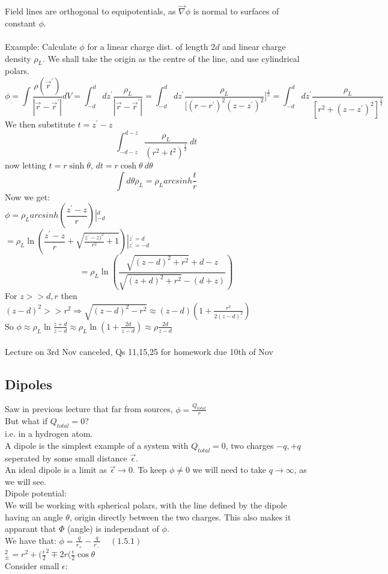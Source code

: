 \documentclass[a4paper,11pt]{article}
\begin{document}
Field lines are orthogonal to equipotentials, as $\vec{\nabla}\phi$ is normal to surfaces of constant $\phi$.\\
\\
Example: Calculate $\phi$ for a linear charge dist. of length $2d$ and linear charge density $\rho _{L}$.
We shall take the origin as the centre of the line, and use cylindrical polars.\\
$$\phi = \int \dfrac{\rho(\vec{r}^\prime)}{|\vec{r}-\vec{r}^\prime|} dV = \int^d _{-d} dz^\prime \dfrac{\rho_{L}}{|\vec{r}-\vec{r}^\prime|}=\int ^d _{-d} dz^\prime \dfrac{\rho_{L}}{[(r-r^\prime)^2(z-z^\prime)^2}]^\frac{1}{2} =\int^d _{-d} dz^\prime \dfrac{\rho _{L}}{[r^2 +(z-z^\prime)^2]^\frac{1}{2}}$$
We then substitute $t=z^\prime - z$\\
$$\int^{d-z} _{-d-z} \dfrac{\rho_{L}}{(r^2 + t^2)^\frac{1}{2}} ~dt$$
now letting $t=r\sinh\theta$, $dt=r\cosh\theta ~d\theta$\\
$$\int d\theta \rho_{L} = \rho_{L} arcsinh\frac{t}{r}$$
Now we get:\\
$\phi=\rho_{L} arcsinh\left(\dfrac{z^\prime -z}{r}\right) \left|^d _{-d} \right.$\\
$=\rho_{L} \ln\left(\dfrac{z^\prime - z}{r}+\sqrt{\frac{z^\prime-z)^2}{r^2}+1} \right )\left|^{z^\prime =d} _{z^\prime = -d} \right.$\\
$$=\rho_L \ln(\dfrac{\sqrt{(z-d)^2 +r^2}+d-z}{\sqrt{(z+d)^2 +r^2}-(d+z)})$$
For $z>>d,r$ then $(z-d)^2 >>r^2 \Rightarrow \sqrt{(z-d)^2 -r^2} \approx (z-d)(1+\frac{r^2}{2(z-d)^2})$\\
So $\phi \approx \rho_{L} \ln \frac{z+d}{z-d} \approx \rho_L \ln(1+\frac{2d}{z-d}) \approx \rho \frac{2d}{z-d}$\\ 
\\
Lecture on 3rd Nov canceled, Qs 11,15,25 for homework due 10th of Nov

\subsection{Dipoles}

Saw in previous lecture that far from sources, $\phi=\frac{Q_{total}}{r}$\\
But what if $Q_{total} = 0$?\\
i.e. in a hydrogen atom.\\
A dipole is the simplest example of a system with $Q_{total}=0$, two charges $-q,+q$ seperated by some small distance $\vec{\epsilon}$.\\
An ideal dipole is a limit as $\vec{\epsilon}\rightarrow 0$. To keep $\phi\neq0$ we will need to take $q\rightarrow \infty$, as we will see.\\
Dipole potential:\\
We will be working with spherical polars, with the line defined by the dipole having an angle $\theta$, origin directly between the two charges. This also makes it apparant that $\Phi$ (angle) is independant of $\phi$.\\
We have that:
$\phi=\frac{q}{r_{+}}-\frac{q}{r_{-}}~~~~~(1.5.1)$\\
$_{\pm} ^2 = r^2+(\frac{\epsilon}{2}^2 \mp 2r(\frac{\epsilon}{2}\cos\theta$\\
Consider small $\epsilon$:
\end{document}
